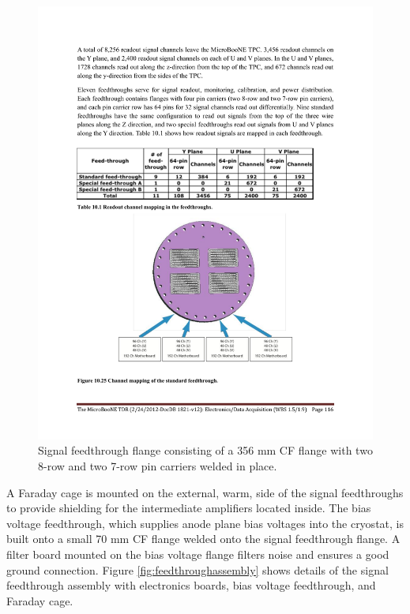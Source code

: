 \begin{figure}
\begin{center}
\includegraphics[width=0.6\linewidth]{figures/signal_feedthrough_standard.pdf}
\end{center}
\caption{\label{fig:feedthroughflange}Signal feedthrough flange consisting of a 356 mm CF flange with two 8-row and two 7-row pin carriers welded in place.}
\end{figure}

A Faraday cage is mounted on the external, warm, side of the signal feedthroughs to provide shielding for the intermediate amplifiers located inside.  The bias voltage feedthrough, which supplies anode plane bias voltages into the cryostat, is built onto a small 70 mm CF flange welded onto the signal feedthrough flange. A filter board mounted on the bias voltage flange filters noise and ensures a good ground connection. Figure \ref{fig:feedthroughassembly} shows details of the signal feedthrough assembly with electronics boards, bias voltage feedthrough, and Faraday cage.


